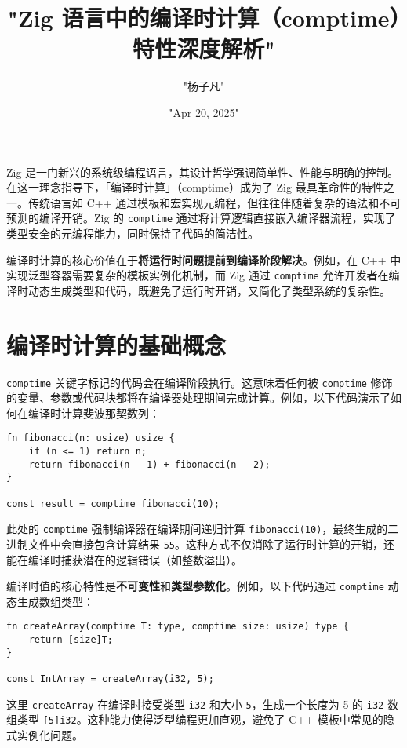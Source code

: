 \title{"Zig 语言中的编译时计算（comptime）特性深度解析"}
\author{"杨子凡"}
\date{"Apr 20, 2025"}
\maketitle
Zig 是一门新兴的系统级编程语言，其设计哲学强调简单性、性能与明确的控制。在这一理念指导下，「编译时计算」（comptime）成为了 Zig 最具革命性的特性之一。传统语言如 C++ 通过模板和宏实现元编程，但往往伴随着复杂的语法和不可预测的编译开销。Zig 的 \verb!comptime! 通过将计算逻辑直接嵌入编译器流程，实现了类型安全的元编程能力，同时保持了代码的简洁性。\par
编译时计算的核心价值在于\textbf{将运行时问题提前到编译阶段解决}。例如，在 C++ 中实现泛型容器需要复杂的模板实例化机制，而 Zig 通过 \verb!comptime! 允许开发者在编译时动态生成类型和代码，既避免了运行时开销，又简化了类型系统的复杂性。\par
\chapter{编译时计算的基础概念}
\verb!comptime! 关键字标记的代码会在编译阶段执行。这意味着任何被 \verb!comptime! 修饰的变量、参数或代码块都将在编译器处理期间完成计算。例如，以下代码演示了如何在编译时计算斐波那契数列：\par
\begin{lstlisting}[language=zig]
fn fibonacci(n: usize) usize {
    if (n <= 1) return n;
    return fibonacci(n - 1) + fibonacci(n - 2);
}

const result = comptime fibonacci(10);
\end{lstlisting}
此处的 \verb!comptime! 强制编译器在编译期间递归计算 \verb!fibonacci(10)!，最终生成的二进制文件中会直接包含计算结果 \verb!55!。这种方式不仅消除了运行时计算的开销，还能在编译时捕获潜在的逻辑错误（如整数溢出）。\par
编译时值的核心特性是\textbf{不可变性}和\textbf{类型参数化}。例如，以下代码通过 \verb!comptime! 动态生成数组类型：\par
\begin{lstlisting}[language=zig]
fn createArray(comptime T: type, comptime size: usize) type {
    return [size]T;
}

const IntArray = createArray(i32, 5);
\end{lstlisting}
这里 \verb!createArray! 在编译时接受类型 \verb!i32! 和大小 \verb!5!，生成一个长度为 5 的 \verb!i32! 数组类型 \verb![5]i32!。这种能力使得泛型编程更加直观，避免了 C++ 模板中常见的隐式实例化问题。\par
